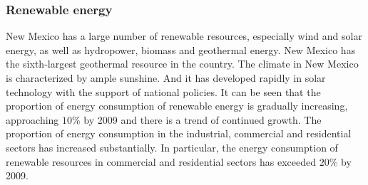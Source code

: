 \documentclass{mcmthesis}
\begin{document}
\subsubsection{Renewable energy}
  New Mexico has a large number of renewable resources, especially wind and solar energy, as well as hydropower, biomass and geothermal energy.
  New Mexico has the sixth-largest geothermal resource in the country. The climate in New Mexico is characterized by ample sunshine.
  And it has developed rapidly in solar technology with the support of national policies. It can be seen that the proportion of energy
  consumption of renewable energy is gradually increasing, approaching $10\%$ by 2009 and there is a trend of continued growth.
  The proportion of energy consumption in the industrial, commercial and residential sectors has increased substantially.
  In particular, the energy consumption of renewable resources in commercial and residential sectors has exceeded $20\%$ by 2009.
\end{document}
